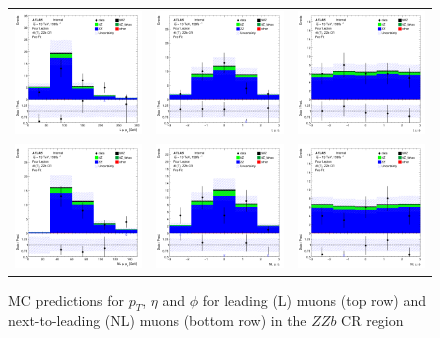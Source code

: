 \begin{figure}[htbp]
    \centering
  \begin{tabular}{ccc}


    \includegraphics[width=.2\textwidth]{figures/PreFitPlots/lep4_ZZb_4T_L_mu_pt} &
    \includegraphics[width=.2\textwidth]{figures/PreFitPlots/lep4_ZZb_4T_L_mu_eta} &
    \includegraphics[width=.2\textwidth]{figures/PreFitPlots/lep4_ZZb_4T_L_mu_phi} \\
    \includegraphics[width=.2\textwidth]{figures/PreFitPlots/lep4_ZZb_4T_NL_mu_pt} &
    \includegraphics[width=.2\textwidth]{figures/PreFitPlots/lep4_ZZb_4T_NL_mu_eta} &
    \includegraphics[width=.2\textwidth]{figures/PreFitPlots/lep4_ZZb_4T_NL_mu_phi} \\

  \end{tabular}
    \caption{MC predictions for $p_{T}$, $\eta$ and $\phi$ for leading (L) muons (top row) and next-to-leading (NL) muons (bottom row) in the $ZZb$ CR region }
\end{figure}


